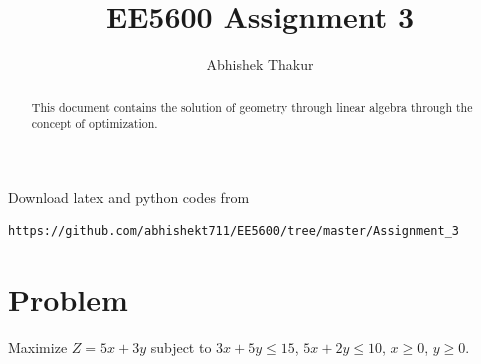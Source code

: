 \documentclass[journal,12pt,twocolumn]{IEEEtran}
\begin{document}
     \def\rightbox#1{\makebox[0in][r]{#1}}
     \def\centbox#1{\makebox[0in]{#1}}
     \def\topbox#1{\raisebox{-\baselineskip}[0in][0in]{#1}}
     \def\midbox#1{\raisebox{-0.5\baselineskip}[0in][0in]{#1}}
\vspace{3cm}
\title{EE5600 Assignment 3}
\author{Abhishek Thakur}
\maketitle
\newpage
\bigskip
\renewcommand{\thefigure}{\theenumi}
\renewcommand{\thetable}{\theenumi}
\newcommand\hlight[1]{\tikz[overlay, remember picture,baseline=-\the\dimexpr\fontdimen22\textfont2\relax]\node[rectangle,fill=blue!50,rounded corners,fill opacity = 0.2,draw,thick,text opacity =1] {$#1$};}
\begin{abstract}
This document contains the solution of geometry through linear algebra through the concept of optimization.
\end{abstract}
Download latex and python codes from 
\begin{lstlisting}
https://github.com/abhishekt711/EE5600/tree/master/Assignment_3
\end{lstlisting}
%
\section{Problem}
Maximize $Z=5x+3y$ subject to $3x+5y\leq15$, $5x+2y\leq10$, $x\geq0$, $y\geq0$.\\
\end{document}
